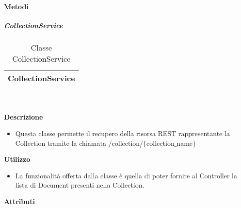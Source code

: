 		\textbf{Metodi} 
	\begin{itemize}
		\end{itemize}
			\subparagraph{CollectionService} 
\begin{table}[ht]
\begin{center}
\bgroup
	\setlength{\arrayrulewidth}{0.6mm}
	\def\arraystretch{1}
		\begin{tabular}{ | p{12cm} | }
				\hline  
					\centerline{\textbf{CollectionService}}
		\\ \hline 
				\hline
				\hline
		
		\end{tabular}
\egroup
\caption{Classe CollectionService}
\end{center}
\end{table}  \textbf{\\ \\ Descrizione} 
					\begin{itemize}
						\item[] Questa classe permette il recupero della risorsa REST rappresentante la Collection tramite la chiamata  /collection/$\{$collection$\_$name$\}$
					\end{itemize}      
				\textbf{Utilizzo}  
					\begin{itemize}
						\item[] La  funzionalità offerta dalla classe è quella di poter fornire al Controller la lista di Document presenti nella Collection.
					\end{itemize}
			 \textbf{Attributi} 
	\begin{itemize}
		\end{itemize}
		
